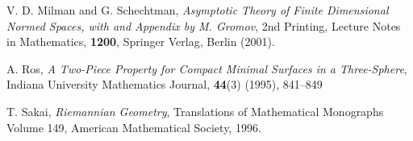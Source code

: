 \documentclass{amsart}
\theoremstyle{definition}
\theoremstyle{remark}
\begin{document}

\begin{thebibliography}{10}
  



   



 V. D. Milman and G. Schechtman,
\textit{Asymptotic Theory of Finite Dimensional Normed Spaces, with and Appendix by M. Gromov}, 2nd Printing,
Lecture Notes in Mathematics, \textbf{1200},  Springer Verlag,
Berlin (2001).

 A. Ros,
\textit{A Two-Piece Property for Compact Minimal Surfaces in a Three-Sphere}, Indiana University Mathematics Journal, \textbf{44}(3) (1995), 841--849

 T. Sakai, \textit{Riemannian Geometry}, Translations
of Mathematical Monographs Volume 149, American Mathematical
Society, 1996.


\end{thebibliography}
\end{document}
